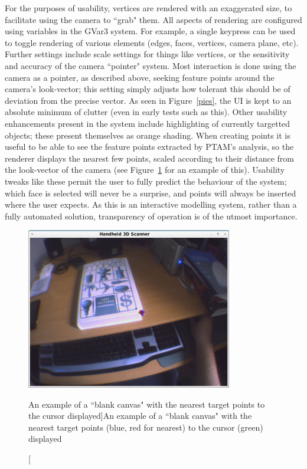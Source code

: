 \documentclass[a4paper,10pt]{report}
\begin{document}
For the purposes of usability, vertices are rendered with an exaggerated size, to facilitate using the camera to ``grab" them. All aspects of rendering are configured using variables in the GVar3 system. For example, a single keypress can be used to toggle rendering of various elements (edges, faces, vertices, camera plane, etc). Further settings include scale settings for things like vertices, or the sensitivity and accuracy of the camera ``pointer" system. Most interaction is done using the camera as a pointer, as described above, seeking feature points around the camera's look-vector; this setting simply adjusts how tolerant this should be of deviation from the precise vector. As seen in Figure~\ref{pies}, the UI is kept to an absolute minimum of clutter (even in early tests such as this). Other usability enhancements present in the system include highlighting of currently targetted objects; these present themselves as orange shading. When creating points it is useful to be able to see the feature points extracted by PTAM's analysis, so the renderer displays the nearest few points, scaled according to their distance from the look-vector of the camera (see Figure~\ref{targets} for an example of this). Usability tweaks like these permit the user to fully predict the behaviour of the system; which face is selected will never be a surprise, and points will always be inserted where the user expects. As this is an interactive modelling system, rather than a fully automated solution, transparency of operation is of the utmost importance.

\begin{figure}
  \begin{center}
    \includegraphics[width=340px]{TargetPoints}
  \end{center}
  \caption[An example of a ``blank canvas" with the nearest target points to the cursor displayed]{An example of a ``blank canvas" with the nearest target points (blue, red for nearest) to the cursor (green) displayed}
  \label{targets}
\end{figure}
\end{document}

